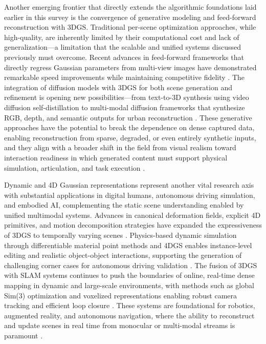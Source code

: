\documentclass[11pt]{article}
\begin{document}
Another emerging frontier that directly extends the algorithmic foundations laid earlier in this survey is the convergence of generative modeling and feed-forward reconstruction with 3DGS. Traditional per-scene optimization approaches, while high-quality, are inherently limited by their computational cost and lack of generalization---a limitation that the scalable and unified systems discussed previously must overcome. Recent advances in feed-forward frameworks that directly regress Gaussian parameters from multi-view images have demonstrated remarkable speed improvements while maintaining competitive fidelity \cite{ref792,ref672}. The integration of diffusion models with 3DGS for both scene generation and refinement is opening new possibilities---from text-to-3D synthesis using video diffusion self-distillation \cite{ref793} to multi-modal diffusion frameworks that synthesize RGB, depth, and semantic outputs for urban reconstruction \cite{ref241}. These generative approaches have the potential to break the dependence on dense captured data, enabling reconstruction from sparse, degraded, or even entirely synthetic inputs, and they align with a broader shift in the field from visual realism toward interaction readiness in which generated content must support physical simulation, articulation, and task execution \cite{ref794,ref795}.

Dynamic and 4D Gaussian representations represent another vital research axis with substantial applications in digital humans, autonomous driving simulation, and embodied AI, complementing the static scene understanding enabled by unified multimodal systems. Advances in canonical deformation fields, explicit 4D primitives, and motion decomposition strategies have expanded the expressiveness of 3DGS to temporally varying scenes \cite{ref796}. Physics-based dynamic simulation through differentiable material point methods and 4DGS enables instance-level editing and realistic object-object interactions, supporting the generation of challenging corner cases for autonomous driving validation \cite{ref797}. The fusion of 3DGS with SLAM systems continues to push the boundaries of online, real-time dense mapping in dynamic and large-scale environments, with methods such as global Sim(3) optimization and voxelized representations enabling robust camera tracking and efficient loop closure \cite{ref798,ref799}. These systems are foundational for robotics, augmented reality, and autonomous navigation, where the ability to reconstruct and update scenes in real time from monocular or multi-modal streams is paramount \cite{ref800}.
\end{document}
